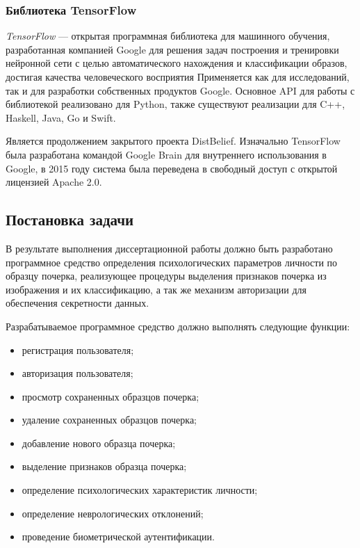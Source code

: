 \subsubsection{Библиотека TensorFlow}
\label{sec:techs:tensor_flow}
\emph{TensorFlow} — открытая программная библиотека для машинного обучения, разработанная компанией Google для решения задач построения и тренировки нейронной сети с целью автоматического нахождения и классификации образов, достигая качества человеческого восприятия Применяется как для исследований, так и для разработки собственных продуктов Google. Основное API для работы с библиотекой реализовано для Python, также существуют реализации для C++, Haskell, Java, Go и Swift.

Является продолжением закрытого проекта DistBelief. Изначально TensorFlow была разработана командой Google Brain для внутреннего использования в Google, в 2015 году система была переведена в свободный доступ с открытой лицензией Apache 2.0.

\subsection{Постановка задачи}
\label{sec:domain:requirements}
В результате выполнения диссертационной работы должно быть разработано программное средство определения психологических параметров личности по образцу почерка, реализующее процедуры выделения признаков почерка из изображения и их классификацию, а так же механизм авторизации для обеспечения секретности данных.

Разрабатываемое программное средство должно выполнять следующие функции:
\begin{itemize}
  \item регистрация пользователя;
  \item авторизация пользователя;
  \item просмотр сохраненных образцов почерка;
  \item удаление сохраненных образцов почерка;
  \item добавление нового образца почерка;
  \item выделение признаков образца почерка;
  \item определение психологических характеристик личности;
  \item определение неврологических отклонений;
  \item проведение биометрической аутентификации.
\end{itemize}

